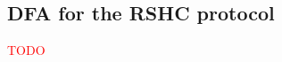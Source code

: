 \begin{appendices}

\section{DFA for the RSHC protocol}
\label{app:dfa}

\textcolor{red}{TODO}


\end{appendices} 